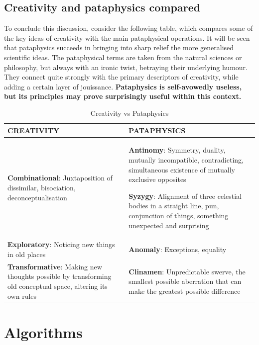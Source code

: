 \subsection{Creativity and pataphysics compared}

To conclude this discussion, consider the following table, which compares some of the key ideas of creativity \citep{Boden2003, Indurkhya, Koestler1964} with the main pataphysical operations. It will be seen that pataphysics succeeds in bringing into sharp relief the more generalised scientific ideas. The pataphysical terms are taken from the natural sciences or philosophy, but always with an ironic twist, betraying their underlying humour. They connect quite strongly with the primary descriptors of creativity, while adding a certain layer of jouissance. \textbf{Pataphysics is self-avowedly useless, but its principles may prove surprisingly useful within this context.}

\begin{table}[htb]
  \begin{tabu}{XX}
  \toprule
  \textbf{CREATIVITY}
  &
  \textbf{PATAPHYSICS}
  \\ \midrule
  \textbf{Combinational}: Juxtaposition of dissimilar, bisociation, deconceptualisation
  &
  \textbf{Antinomy}: Symmetry, duality, mutually incompatible, contradicting, simultaneous existence of mutually exclusive opposites
  \par
  \textbf{Syzygy}: Alignment of three celestial bodies in a
  straight line, pun, conjunction of things, something unexpected
  and surprising
  \\ \midrule
  \textbf{Exploratory}: Noticing new things in old places
  &
  \textbf{Anomaly}: Exceptions, equality
  \\ \midrule
  \textbf{Transformative}: Making new thoughts possible by transforming old conceptual space, altering its own rules
  &
  \textbf{Clinamen}: Unpredictable swerve, the smallest possible aberration that can make the greatest possible difference
  \\
  \bottomrule
  \end{tabu}
\caption[Creativity vs Pataphysics]{Creativity vs Pataphysics}
\label{tab:creatpata}
\end{table}

\section{Algorithms}

